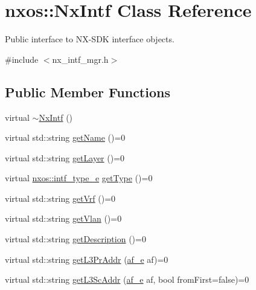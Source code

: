 \hypertarget{classnxos_1_1_nx_intf}{}\section{nxos\+:\+:Nx\+Intf Class Reference}
\label{classnxos_1_1_nx_intf}


Public interface to N\+X-\/\+S\+DK interface objects.  




{\ttfamily \#include $<$nx\+\_\+intf\+\_\+mgr.\+h$>$}

\subsection*{Public Member Functions}
\begin{DoxyCompactItemize}
\item 
virtual \mbox{\hyperlink{classnxos_1_1_nx_intf_a10fbaca5467637b238b8a4f1f1aa75e0}{$\sim$\+Nx\+Intf}} ()
\item 
virtual std\+::string \mbox{\hyperlink{classnxos_1_1_nx_intf_a8a0bff66b97d72172f8ed5ce22d8efbd}{get\+Name}} ()=0
\item 
virtual std\+::string \mbox{\hyperlink{classnxos_1_1_nx_intf_af3a8f5ce6dd05fa582d1f7056a4438ca}{get\+Layer}} ()=0
\item 
virtual \mbox{\hyperlink{namespacenxos_ab2989ad42c12bf1e273c8acd10ffb984}{nxos\+::intf\+\_\+type\+\_\+e}} \mbox{\hyperlink{classnxos_1_1_nx_intf_aa0885ab26e4abfaa8c7e8e8adb9d32ab}{get\+Type}} ()=0
\item 
virtual std\+::string \mbox{\hyperlink{classnxos_1_1_nx_intf_ae8d21d7a42388aedcda5c7bc3f5c4b04}{get\+Vrf}} ()=0
\item 
virtual std\+::string \mbox{\hyperlink{classnxos_1_1_nx_intf_a3f7942d5ae1a998904d9ea97b252eb21}{get\+Vlan}} ()=0
\item 
virtual std\+::string \mbox{\hyperlink{classnxos_1_1_nx_intf_ae18aa83b5f9984c6b133a8d447aa5430}{get\+Description}} ()=0
\item 
virtual std\+::string \mbox{\hyperlink{classnxos_1_1_nx_intf_ace33155a23a777c0f6e5f978d44af0e6}{get\+L3\+Pr\+Addr}} (\mbox{\hyperlink{namespacenxos_a3a667f48b94db10aa398940dc5bf72d7}{af\+\_\+e}} af)=0
\item 
virtual std\+::string \mbox{\hyperlink{classnxos_1_1_nx_intf_af0aebadac66f6b4fbe8ddbd567a577b6}{get\+L3\+Sc\+Addr}} (\mbox{\hyperlink{namespacenxos_a3a667f48b94db10aa398940dc5bf72d7}{af\+\_\+e}} af, bool from\+First=false)=0
\item 

\end{DoxyCompactItemize}
